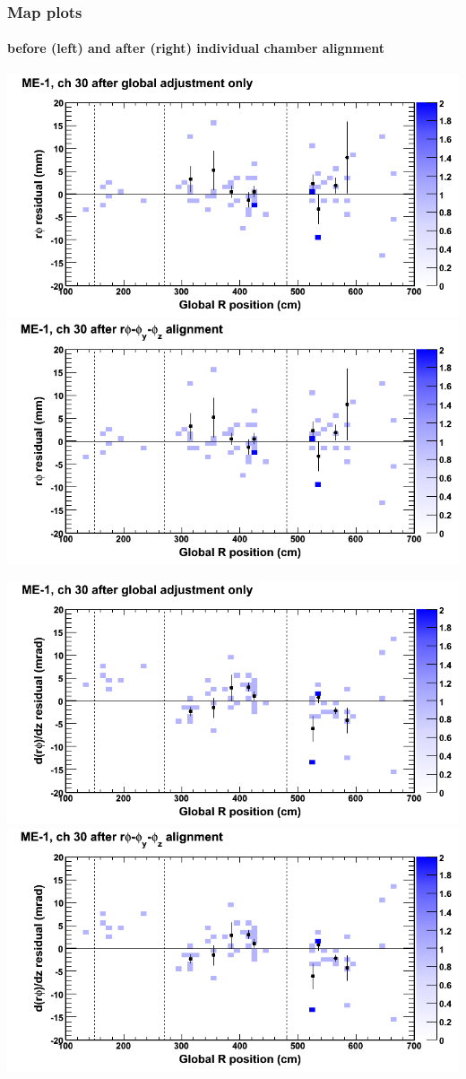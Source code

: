 \documentclass[compress]{beamer}
\begin{document}
\begin{frame}
\frametitle{Map plots}
\framesubtitle{before (left) and after (right) individual chamber alignment}
\includegraphics[width=0.5\linewidth]{ringmapplots_3dof/before_CSCvsr_mem1ch30_x.png} \includegraphics[width=0.5\linewidth]{ringmapplots_3dof/after_CSCvsr_mem1ch30_x.png}

\includegraphics[width=0.5\linewidth]{ringmapplots_3dof/before_CSCvsr_mem1ch30_dxdz.png} \includegraphics[width=0.5\linewidth]{ringmapplots_3dof/after_CSCvsr_mem1ch30_dxdz.png}
\end{frame}
\end{document}
